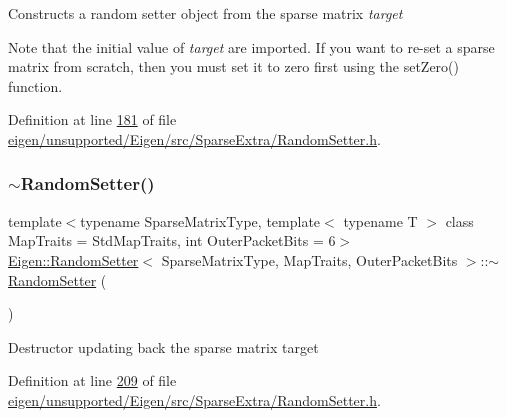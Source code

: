 Constructs a random setter object from the sparse matrix {\itshape target} 

Note that the initial value of {\itshape target} are imported. If you want to re-\/set a sparse matrix from scratch, then you must set it to zero first using the set\+Zero() function. 

Definition at line \hyperlink{eigen_2unsupported_2_eigen_2src_2_sparse_extra_2_random_setter_8h_source_l00181}{181} of file \hyperlink{eigen_2unsupported_2_eigen_2src_2_sparse_extra_2_random_setter_8h_source}{eigen/unsupported/\+Eigen/src/\+Sparse\+Extra/\+Random\+Setter.\+h}.

\mbox{\label{class_eigen_1_1_random_setter_a3e4a78672df59ab4dd2799919b431027}} 
\subsubsection{\texorpdfstring{$\sim$\+Random\+Setter()}{~RandomSetter()}\hspace{0.1cm}{\footnotesize\ttfamily [1/2]}}
{\footnotesize\ttfamily template$<$typename Sparse\+Matrix\+Type, template$<$ typename T $>$ class Map\+Traits = Std\+Map\+Traits, int Outer\+Packet\+Bits = 6$>$ \\
\hyperlink{class_eigen_1_1_random_setter}{Eigen\+::\+Random\+Setter}$<$ Sparse\+Matrix\+Type, Map\+Traits, Outer\+Packet\+Bits $>$\+::$\sim$\hyperlink{class_eigen_1_1_random_setter}{Random\+Setter} (\begin{DoxyParamCaption}{ }\end{DoxyParamCaption})\hspace{0.3cm}{\ttfamily [inline]}}

Destructor updating back the sparse matrix target 

Definition at line \hyperlink{eigen_2unsupported_2_eigen_2src_2_sparse_extra_2_random_setter_8h_source_l00209}{209} of file \hyperlink{eigen_2unsupported_2_eigen_2src_2_sparse_extra_2_random_setter_8h_source}{eigen/unsupported/\+Eigen/src/\+Sparse\+Extra/\+Random\+Setter.\+h}.

\mbox{\label{class_eigen_1_1_random_setter_a62e960bd52cec62a59ebb285f381138f}} 
